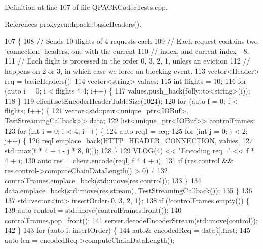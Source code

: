 Definition at line 107 of file Q\+P\+A\+C\+K\+Codec\+Tests.\+cpp.



References proxygen\+::hpack\+::basic\+Headers().


\begin{DoxyCode}
107                                   \{
108   \textcolor{comment}{// Sends 10 flights of 4 requests each}
109   \textcolor{comment}{// Each request contains two 'connection' headers, one with the current}
110   \textcolor{comment}{// index, and current index - 8.}
111   \textcolor{comment}{// Each flight is processed in the order 0, 3, 2, 1, unless an eviction}
112   \textcolor{comment}{// happens on 2 or 3, in which case we force an blocking event.}
113   vector<Header> req = basicHeaders();
114   vector<string> values;
115   \textcolor{keywordtype}{int} flights = 10;
116   \textcolor{keywordflow}{for} (\textcolor{keyword}{auto} i = 0; i < flights * 4; i++) \{
117     values.push\_back(folly::to<string>(i));
118   \}
119   client.setEncoderHeaderTableSize(1024);
120   \textcolor{keywordflow}{for} (\textcolor{keyword}{auto} f = 0; f < flights; f++) \{
121     vector<std::pair<unique\_ptr<IOBuf>, TestStreamingCallback>> data;
122     list<unique\_ptr<IOBuf>> controlFrames;
123     \textcolor{keywordflow}{for} (\textcolor{keywordtype}{int} i = 0; i < 4; i++) \{
124       \textcolor{keyword}{auto} reqI = req;
125       \textcolor{keywordflow}{for} (\textcolor{keywordtype}{int} j = 0; j < 2; j++) \{
126         reqI.emplace\_back(HTTP\_HEADER\_CONNECTION, values[
127                             std::max(f * 4 + i - j * 8, 0)]);
128       \}
129       VLOG(4) << \textcolor{stringliteral}{"Encoding req="} << f * 4 + i;
130       \textcolor{keyword}{auto} res = client.encode(reqI, f * 4 + i);
131       \textcolor{keywordflow}{if} (res.control && res.control->computeChainDataLength() > 0) \{
132         controlFrames.emplace\_back(std::move(res.control));
133       \}
134       data.emplace\_back(std::move(res.stream), TestStreamingCallback());
135     \}
136 
137     std::vector<int> insertOrder\{0, 3, 2, 1\};
138     \textcolor{keywordflow}{if} (!controlFrames.empty()) \{
139       \textcolor{keyword}{auto} control = std::move(controlFrames.front());
140       controlFrames.pop\_front();
141       server.decodeEncoderStream(std::move(control));
142     \}
143     \textcolor{keywordflow}{for} (\textcolor{keyword}{auto} i: insertOrder) \{
144       \textcolor{keyword}{auto}& encodedReq = data[i].first;
145       \textcolor{keyword}{auto} len = encodedReq->computeChainDataLength();

\end{DoxyCode}
